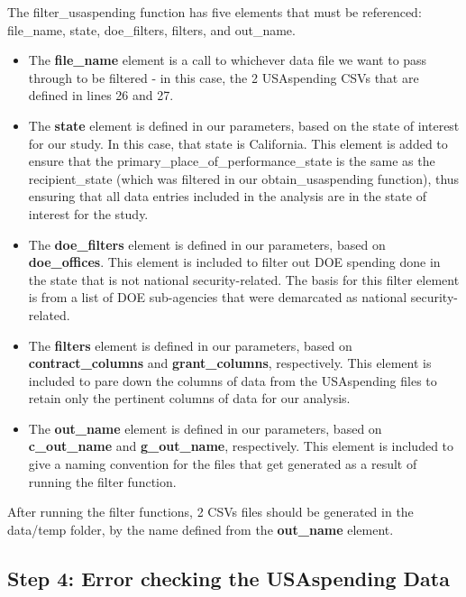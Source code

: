 \documentclass[
]{book}
\providecommand{\tightlist}{%
  \setlength{\itemsep}{0pt}\setlength{\parskip}{0pt}}
\begin{document}
The filter\_usaspending function has five elements that must be referenced: file\_name, state, doe\_filters, filters, and out\_name.

\begin{itemize}
\tightlist
\item
  The \textbf{file\_name} element is a call to whichever data file we want to pass through to be filtered - in this case, the 2 USAspending CSVs that are defined in lines 26 and 27.
\item
  The \textbf{state} element is defined in our parameters, based on the state of interest for our study. In this case, that state is California. This element is added to ensure that the primary\_place\_of\_performance\_state is the same as the recipient\_state (which was filtered in our obtain\_usaspending function), thus ensuring that all data entries included in the analysis are in the state of interest for the study.
\item
  The \textbf{doe\_filters} element is defined in our parameters, based on \textbf{doe\_offices}. This element is included to filter out DOE spending done in the state that is not national security-related. The basis for this filter element is from a list of DOE sub-agencies that were demarcated as national security-related.
\item
  The \textbf{filters} element is defined in our parameters, based on \textbf{contract\_columns} and \textbf{grant\_columns}, respectively. This element is included to pare down the columns of data from the USAspending files to retain only the pertinent columns of data for our analysis.
\item
  The \textbf{out\_name} element is defined in our parameters, based on \textbf{c\_out\_name} and \textbf{g\_out\_name}, respectively. This element is included to give a naming convention for the files that get generated as a result of running the filter function.
\end{itemize}

After running the filter functions, 2 CSVs files should be generated in the data/temp folder, by the name defined from the \textbf{out\_name} element.

\hypertarget{step-4-error-checking-the-usaspending-data}{%
\subsection{Step 4: Error checking the USAspending Data}\label{step-4-error-checking-the-usaspending-data}}
\end{document}
